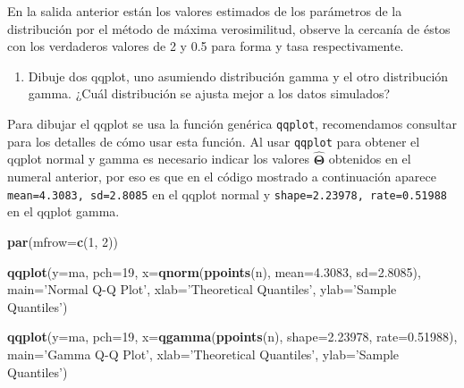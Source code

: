 \documentclass[10pt,]{krantz}
\makeatletter
\newenvironment{Shaded}{\begin{snugshade}}{\end{snugshade}}
\newcommand{\KeywordTok}[1]{\textcolor[rgb]{0.13,0.29,0.53}{\textbf{{#1}}}}
\newcommand{\DataTypeTok}[1]{\textcolor[rgb]{0.13,0.29,0.53}{{#1}}}
\newcommand{\DecValTok}[1]{\textcolor[rgb]{0.00,0.00,0.81}{{#1}}}
\newcommand{\FloatTok}[1]{\textcolor[rgb]{0.00,0.00,0.81}{{#1}}}
\newcommand{\StringTok}[1]{\textcolor[rgb]{0.31,0.60,0.02}{{#1}}}
\newcommand{\NormalTok}[1]{{#1}}
\providecommand{\tightlist}{%
  \setlength{\itemsep}{0pt}\setlength{\parskip}{0pt}}
\newenvironment{kframe}{%
\medskip{}
\setlength{\fboxsep}{.8em}
 \def\at@end@of@kframe{}%
 \ifinner\ifhmode%
  \def\at@end@of@kframe{\end{minipage}}%
  \begin{minipage}{\columnwidth}%
 \fi\fi%
 \def\FrameCommand##1{\hskip\@totalleftmargin \hskip-\fboxsep
 \colorbox{shadecolor}{##1}\hskip-\fboxsep
     \hskip-\linewidth \hskip-\@totalleftmargin \hskip\columnwidth}%
 \MakeFramed {\advance\hsize-\width
   \@totalleftmargin\z@ \linewidth\hsize
   \@setminipage}}%
 {\par\unskip\endMakeFramed%
 \at@end@of@kframe}
\renewenvironment{Shaded}{\begin{kframe}}{\end{kframe}}
\makeatother
\begin{document}
En la salida anterior están los valores estimados de los parámetros de
la distribución por el método de máxima verosimilitud, observe la
cercanía de éstos con los verdaderos valores de 2 y 0.5 para forma y
tasa respectivamente.

\begin{enumerate}
\def\labelenumi{\arabic{enumi})}
\setcounter{enumi}{2}
\tightlist
\item
  Dibuje dos qqplot, uno asumiendo distribución gamma y el otro
  distribución gamma. ¿Cuál distribución se ajusta mejor a los datos
  simulados?
\end{enumerate}

Para dibujar el qqplot se usa la función genérica \texttt{qqplot},
recomendamos consultar \citet{hernandez_correa} para los detalles de
cómo usar esta función. Al usar \texttt{qqplot} para obtener el qqplot
normal y gamma es necesario indicar los valores
\(\hat{\boldsymbol{\Theta}}\) obtenidos en el numeral anterior, por eso
es que en el código mostrado a continuación aparece
\texttt{mean=4.3083,\ sd=2.8085} en el qqplot normal y
\texttt{shape=2.23978,\ rate=0.51988} en el qqplot gamma.

\begin{Shaded}
\begin{Highlighting}[]
\KeywordTok{par}\NormalTok{(}\DataTypeTok{mfrow=}\KeywordTok{c}\NormalTok{(}\DecValTok{1}\NormalTok{, }\DecValTok{2}\NormalTok{))}

\KeywordTok{qqplot}\NormalTok{(}\DataTypeTok{y=}\NormalTok{ma, }\DataTypeTok{pch=}\DecValTok{19}\NormalTok{,}
       \DataTypeTok{x=}\KeywordTok{qnorm}\NormalTok{(}\KeywordTok{ppoints}\NormalTok{(n), }\DataTypeTok{mean=}\FloatTok{4.3083}\NormalTok{, }\DataTypeTok{sd=}\FloatTok{2.8085}\NormalTok{),}
       \DataTypeTok{main=}\StringTok{'Normal Q-Q Plot'}\NormalTok{,}
       \DataTypeTok{xlab=}\StringTok{'Theoretical Quantiles'}\NormalTok{,}
       \DataTypeTok{ylab=}\StringTok{'Sample Quantiles'}\NormalTok{)}

\KeywordTok{qqplot}\NormalTok{(}\DataTypeTok{y=}\NormalTok{ma, }\DataTypeTok{pch=}\DecValTok{19}\NormalTok{,}
       \DataTypeTok{x=}\KeywordTok{qgamma}\NormalTok{(}\KeywordTok{ppoints}\NormalTok{(n), }\DataTypeTok{shape=}\FloatTok{2.23978}\NormalTok{, }\DataTypeTok{rate=}\FloatTok{0.51988}\NormalTok{),}
       \DataTypeTok{main=}\StringTok{'Gamma Q-Q Plot'}\NormalTok{,}
       \DataTypeTok{xlab=}\StringTok{'Theoretical Quantiles'}\NormalTok{,}
       \DataTypeTok{ylab=}\StringTok{'Sample Quantiles'}\NormalTok{)}
\end{Highlighting}
\end{Shaded}
\end{document}
